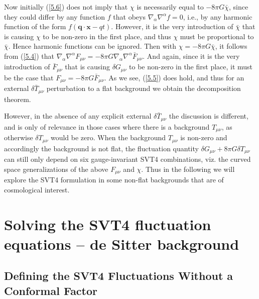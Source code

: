 \documentclass[aps,onecolumn,10pt]{revtex4}
\numberwithin{equation}{section}
\numberwithin{equation}{section}
\begin{document}
Now initially (\ref{5.6})  does not imply that $\chi$ is necessarily equal to $-8\pi G\bar{\chi}$, since they could differ by any function $f$ that obeys $\nabla_{\alpha}\nabla^{\alpha}f=0$, i.e., by any harmonic function of the form $f(\mathbf{q}\cdot\mathbf{x}-q t)$. However, it is the very introduction of $\bar{\chi}$ that is causing $\chi$ to be non-zero in the first place, and thus $\chi$ must be proportional to $\bar{\chi}$. Hence harmonic functions can be ignored. Then with  $\chi=-8\pi G\bar{\chi}$, it follows from (\ref{5.4}) that $\nabla_{\alpha}\nabla^{\alpha}F_{\mu\nu}=-8 \pi G\nabla_{\alpha}\nabla^{\alpha}\bar{F}_{\mu\nu}$. And again, since it is the very introduction of $\bar{F}_{\mu\nu}$ that is causing $\delta G_{\mu\nu}$ to be non-zero in the first place, it must be the case that $F_{\mu\nu}=-8 \pi G\bar{F}_{\mu\nu}$. As we see, (\ref{5.5}) does hold, and thus for an external $\delta \bar{T}_{\mu\nu}$ perturbation to a flat background we  obtain the decomposition theorem.

However, in the absence of any explicit external $\delta \bar{T}_{\mu\nu}$ the discussion is different, and is only of relevance in those cases where there is a background $T_{\mu\nu}$, as otherwise $\delta T_{\mu\nu}$ would be zero. When the background $T_{\mu\nu}$ is non-zero and accordingly the background is not flat, the fluctuation quantity $\delta G_{\mu\nu}+8\pi G \delta T_{\mu\nu}$ can still only depend on six gauge-invariant SVT4 combinations, viz. the curved space generalizations of the above  $F_{\mu\nu}$ and $\chi$. Thus in the following we will explore the SVT4 formulation in some non-flat backgrounds that are of cosmological interest.

\section{Solving the SVT4 fluctuation equations -- de Sitter background}
\label{S6}
\subsection{Defining the SVT4 Fluctuations Without a Conformal Factor}
\end{document}
